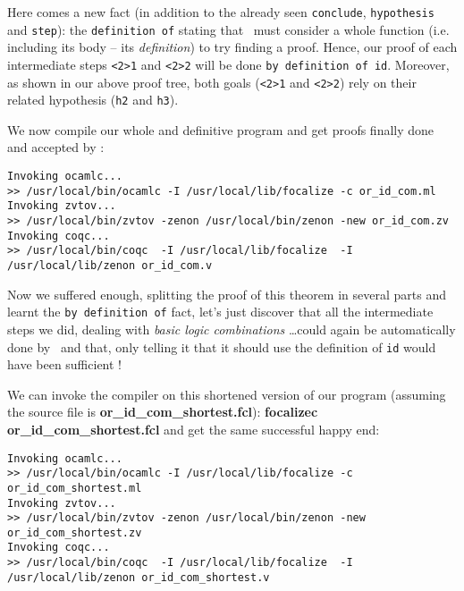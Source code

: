 \documentclass[11pt,a4paper,twoside,onecolumn,fullpage]{article}
\begin{document}
Here comes
a new fact (in addition to the already seen \lstinline"conclude",
\lstinline"hypothesis" and \lstinline"step"): the
\lstinline"definition of" stating that \zenon\ must consider a whole
function (i.e. including its body -- its {\em definition}) to try
finding a proof. Hence, our proof of each intermediate steps
\lstinline"<2>1" and \lstinline"<2>2" will be done
\lstinline"by definition of id". Moreover, as shown in our above proof
tree, both goals (\lstinline"<2>1" and \lstinline"<2>2") rely on their
related hypothesis (\lstinline"h2" and \lstinline"h3").

{\scriptsize
}

We now compile our whole and definitive program and get proofs finally
done and accepted by \coq:

{\scriptsize
\begin{verbatim}
Invoking ocamlc...
>> /usr/local/bin/ocamlc -I /usr/local/lib/focalize -c or_id_com.ml
Invoking zvtov...
>> /usr/local/bin/zvtov -zenon /usr/local/bin/zenon -new or_id_com.zv
Invoking coqc...                                                
>> /usr/local/bin/coqc  -I /usr/local/lib/focalize  -I /usr/local/lib/zenon or_id_com.v
\end{verbatim}}

Now we suffered enough, splitting the proof of this theorem in several
parts and learnt the \lstinline{by definition of} fact, let's just
discover that all the intermediate steps we did, dealing with {\em basic
logic combinations} \ldots could again be automatically done by
\zenon\ and that, only telling it that it should use the definition of
\lstinline{id} would have been sufficient !

{\scriptsize
}

We can invoke the compiler on this shortened version of our program
(assuming the source file is \textbf{or\_id\_com\_shortest.fcl}):
\textbf{focalizec or\_id\_com\_shortest.fcl} and get the same successful
happy end:

{\scriptsize
\begin{verbatim}
Invoking ocamlc...
>> /usr/local/bin/ocamlc -I /usr/local/lib/focalize -c or_id_com_shortest.ml
Invoking zvtov...
>> /usr/local/bin/zvtov -zenon /usr/local/bin/zenon -new or_id_com_shortest.zv
Invoking coqc...                                               
>> /usr/local/bin/coqc  -I /usr/local/lib/focalize  -I /usr/local/lib/zenon or_id_com_shortest.v
\end{verbatim}}
\end{document}
